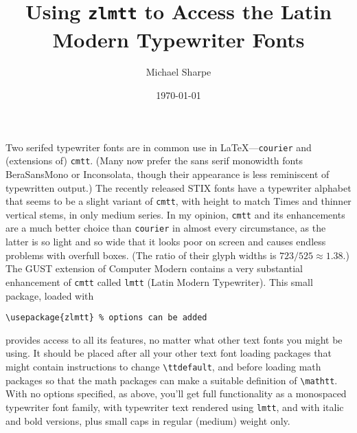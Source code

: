\documentclass[11pt]{article}
\title{Using {\tt zlmtt} to Access the Latin Modern Typewriter Fonts}
\author{Michael Sharpe}
\date{\today}  %
\begin{document}
\maketitle
Two serifed typewriter fonts are in common use in \LaTeX---{\tt courier} and (extensions of) {\tt cmtt}. (Many now prefer the sans serif monowidth fonts BeraSansMono or Inconsolata, though their appearance is less reminiscent of typewritten output.) The recently released STIX fonts have a typewriter alphabet that seems to be a slight variant of {\tt cmtt}, with height to match Times and thinner vertical stems, in only medium series. In my opinion, {\tt cmtt} and its enhancements are a much better choice than {\tt courier} in almost every circumstance, as the latter is so light and so wide that it looks poor on screen and causes endless problems with overfull boxes. (The ratio of their glyph widths is $723/525\approx1.38$.) The GUST extension of Computer Modern contains a very substantial enhancement of {\tt cmtt} called {\tt lmtt} (Latin Modern Typewriter). This small package, loaded with
\begin{verbatim}
\usepackage{zlmtt} % options can be added
\end{verbatim}
provides access to all its features, no matter what other text fonts you might be using. It should be placed after all your other text font loading packages that might contain instructions to change \verb|\ttdefault|, and before loading math packages so that the math packages can make a suitable definition of \verb|\mathtt|. With no options specified, as above, you'll get full functionality as a monospaced typewriter font family, with typewriter text rendered using {\tt lmtt}, and with italic and bold versions, plus small caps in regular (medium) weight only. 
\end{document}
